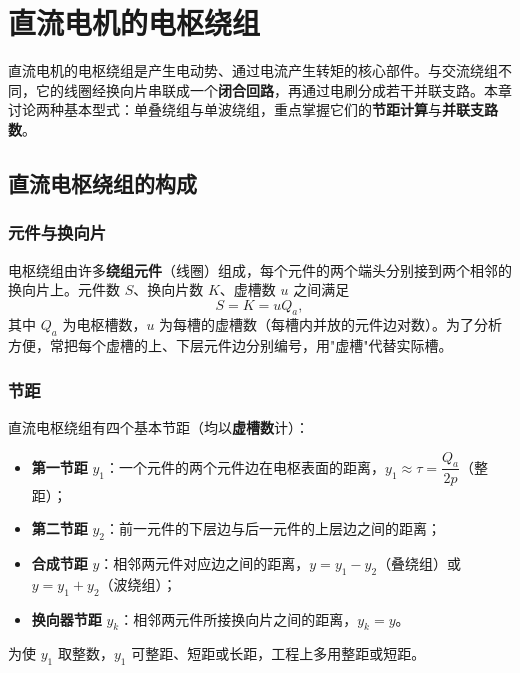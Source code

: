 \chapter{直流电机的电枢绕组}

直流电机的电枢绕组是产生电动势、通过电流产生转矩的核心部件。与交流绕组不同，它的线圈经换向片串联成一个\textbf{闭合回路}，再通过电刷分成若干并联支路。本章讨论两种基本型式：单叠绕组与单波绕组，重点掌握它们的\textbf{节距计算}与\textbf{并联支路数}。

\section{直流电枢绕组的构成}

\subsection{元件与换向片}
电枢绕组由许多\textbf{绕组元件}（线圈）组成，每个元件的两个端头分别接到两个相邻的换向片上。元件数 $S$、换向片数 $K$、虚槽数 $u$ 之间满足
\begin{equation}
S=K=uQ_a ,
\end{equation}
其中 $Q_a$ 为电枢槽数，$u$ 为每槽的虚槽数（每槽内并放的元件边对数）。为了分析方便，常把每个虚槽的上、下层元件边分别编号，用"虚槽"代替实际槽。

\subsection{节距}
直流电枢绕组有四个基本节距（均以\textbf{虚槽数}计）：
\begin{itemize}
  \item \textbf{第一节距} $y_1$：一个元件的两个元件边在电枢表面的距离，$y_1\approx\tau=\dfrac{Q_a}{2p}$（整距）；
  \item \textbf{第二节距} $y_2$：前一元件的下层边与后一元件的上层边之间的距离；
  \item \textbf{合成节距} $y$：相邻两元件对应边之间的距离，$y=y_1-y_2$（叠绕组）或 $y=y_1+y_2$（波绕组）；
  \item \textbf{换向器节距} $y_k$：相邻两元件所接换向片之间的距离，$y_k=y$。
\end{itemize}
为使 $y_1$ 取整数，$y_1$ 可整距、短距或长距，工程上多用整距或短距。

